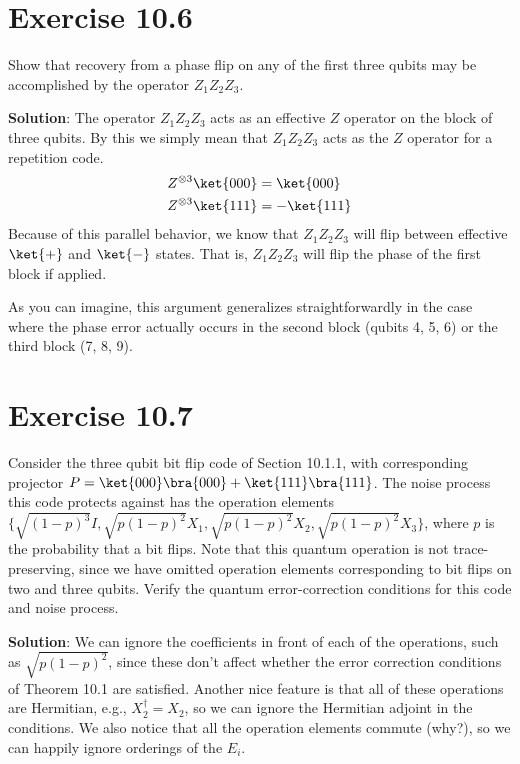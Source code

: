\documentclass{book}
\begin{document}
\section*{Exercise 10.6}
    Show that recovery from a phase flip on any of the first three qubits may be accomplished by the operator $Z_1 Z_2 Z_3$.
    
    \textbf{Solution}: The operator $Z_1 Z_2 Z_3$ acts as an effective $Z$ operator on the block of three qubits. By this we simply mean that $Z_1 Z_2 Z_3$ acts as the $Z$ operator for a repetition code.
    \begin{align}
    \begin{aligned}
        Z^{\otimes{3}} \ket{000} &= \ket{000} \\
        Z^{\otimes{3}} \ket{111} &= - \ket{111}
    \end{aligned}
    \end{align}
    Because of this parallel behavior, we know that $Z_1 Z_2 Z_3$ will flip between effective $\ket{+}$ and $\ket{-}$ states. That is, $Z_1 Z_2 Z_3$ will flip the phase of the first block if applied.

    As you can imagine, this argument generalizes straightforwardly in the case where the phase error actually occurs in the second block (qubits 4, 5, 6) or the third block (7, 8, 9). 

\section*{Exercise 10.7}
    Consider the three qubit bit flip code of Section 10.1.1, with corresponding projector $P = \ket{000}\bra{000} + \ket{111}\bra{111}$. The noise process this code protects against has the operation elements \linebreak
    $\{\sqrt{(1-p)^3}I, \sqrt{p(1-p)^2} X_1, \sqrt{p(1-p)^2} X_2, \sqrt{p(1-p)^2} X_3\}$, where $p$ is the probability that a bit flips. Note that this quantum operation is not trace-preserving, since we have omitted operation elements corresponding to bit flips on two and three qubits. Verify the quantum error-correction conditions for this code and noise process.

    \textbf{Solution}: We can ignore the coefficients in front of each of the operations, such as $\sqrt{p(1-p)^2}$, since these don't affect whether the error correction conditions of Theorem 10.1 are satisfied. Another nice feature is that all of these operations are Hermitian, e.g., $X_2^\dagger = X_2$, so we can ignore the Hermitian adjoint in the conditions. We also notice that all the operation elements commute (why?), so we can happily ignore orderings of the $E_i$.
\end{document}
